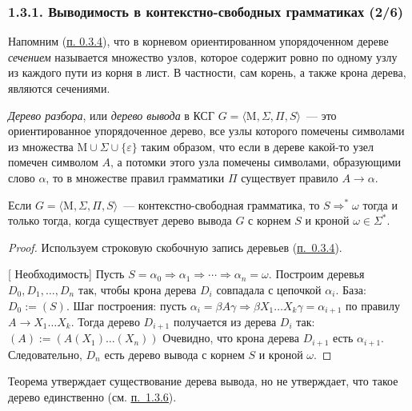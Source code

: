 \documentclass[mathserif,12pt,aspectratio=169]{beamer}
\renewcommand{\index}[1]{}
\def\odmkey#1#2{{\it\color{red} #1}\index{#2}}
\def\Assign{\operatorname{:=}}
\def\proofsection#1{\par{\color{brown}\sffamily\small  [\;}{\sffamily\small\color{brown} #1}{\sffamily\small\color{brown}\;]}\;}
\def\DMref#1#2{{\color{blue}\underline{\hyperlink{#2}{#1}}}}
\begin{document}
\begin{frame}
\frametitle{1.3.1. Выводимость в контекстно-свободных грамматиках (2/6)}

Напомним (\DMref{п. 0.3.4}{0.3.4.}), что в корневом ориентированном упорядоченном дереве
\odmkey{сечением}{Сечение!дерева}
называется множество узлов,
которое содержит ровно по одному узлу из каждого пути из корня
в лист. В частности, сам корень, а также крона дерева, являются сечениями.


\odmkey{Дерево разбора}{Дерево!разбора}, 
или \odmkey{дерево вывода}{Дерево вывода}
в КСГ $G=\langle \mathrm{M}, \Sigma, \Pi, S\rangle$~---
это ориентированное упорядоченное дерево,
все узлы которого помечены 
символами из множества $\mathrm{M}\cup \Sigma \cup \{\varepsilon\}$
таким образом, что если в дереве
какой-то узел помечен символом $A$,
а потомки этого узла помечены символами,
образующими слово 
$\alpha$,
то в множестве правил грамматики $\Pi$
существует правило $A\to\alpha$.


\begin{theorem}
Если $G=\langle \mathrm{M}, \Sigma, \Pi, S\rangle$~--- 
контекстно-свободная грамматика, то 
$S\Rightarrow^*\omega$ тогда и только тогда,
когда существует дерево вывода $G$ с корнем $S$ и кроной $\omega\in \Sigma^*$.
\end{theorem}

\begin{proof} Используем строковую скобочную запись деревьев (\DMref{п.~0.3.4}{0.3.4.}).
\proofsection{Необходимость}
Пусть
$
S = \alpha_0 \Rightarrow \alpha_1 \Rightarrow \cdots \Rightarrow \alpha_n = \omega.
$
Построим  деревья $D_0, D_1, \dots, D_n$ так,
чтобы крона дерева $D_i$ совпадала с цепочкой $\alpha_i$.
База: $D_0\Assign (S)$.
Шаг построения: пусть
$
\alpha_i = \beta A \gamma \Rightarrow \beta X_1 \dots X_k \gamma = \alpha_{i+1}
$
по правилу $A \to X_1 \dots X_k$.
Тогда дерево $D_{i+1}$ получается из дерева $D_i$ так: 
$(A)\Assign(A(X_1)\dots(X_n))$
Очевидно, что крона дерева $D_{i+1}$ есть $\alpha_{i+1}$.
Следовательно, $D_n$ есть дерево вывода с корнем $S$ и кроной $\omega$.
\end{proof}

\begin{remark} 
Теорема утверждает существование дерева вывода,
но не утверждает, что такое дерево единственно
(см. \DMref{п.~1.3.6}{1.3.6.}).
\end{remark}
\end{frame}
\end{document}
